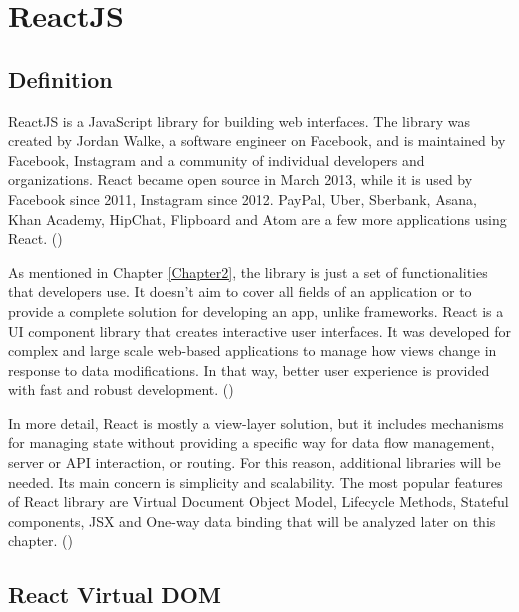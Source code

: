 
\chapter{ReactJS} %

\label{Chapter3} %

\section{Definition}
ReactJS is a JavaScript library for building web interfaces. The library was created by Jordan Walke, a software engineer on Facebook, and is maintained by Facebook, Instagram and a community of individual developers and organizations. React became open source in March 2013, while it is used by Facebook since 2011, Instagram since 2012. PayPal, Uber, Sberbank, Asana, Khan Academy, HipChat, Flipboard and Atom are a few more applications using React. (\cite{reactQuickly}) \par 

As mentioned in Chapter \ref{Chapter2}, the library is just a set of functionalities that developers use. It doesn't aim to cover all fields of an application or to provide a complete solution for developing an app, unlike frameworks. React is a UI component library that creates interactive user interfaces. It was developed for complex and large scale web-based applications to manage how views change in response to data modifications. In that way, better user experience is provided with fast and robust development. (\cite{reactQuickly})  \par

In more detail, React is mostly a view-layer solution, but it includes mechanisms for managing state without providing a specific way for data flow management, server or API interaction, or routing. For this reason, additional libraries will be needed. Its main concern is simplicity and scalability. The most popular features of React library are Virtual Document Object Model, Lifecycle Methods, Stateful components, JSX and One-way data binding that will be analyzed later on this chapter. (\cite{Reference13}) \par

\section{React Virtual DOM}

